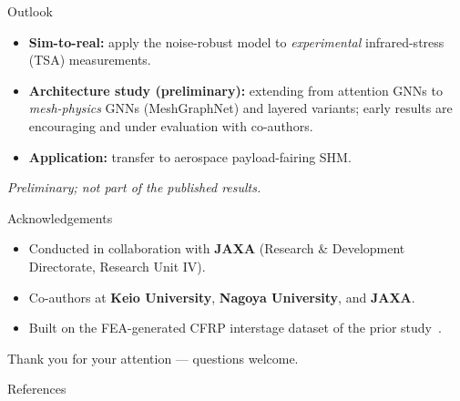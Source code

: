 \documentclass[aspectratio=169,11pt]{beamer}
\renewcommand*{\bibfont}{\scriptsize}
\begin{document}
\begin{frame}{Outlook }
\begin{itemize}
  \item \textbf{Sim-to-real:} apply the noise-robust model to \emph{experimental}
        infrared-stress (TSA) measurements.
  \item \textbf{Architecture study (preliminary):} extending from attention
        GNNs to \emph{mesh-physics} GNNs (MeshGraphNet) and layered variants;
        early results are encouraging and under evaluation with co-authors.
  \item \textbf{Application:} transfer to aerospace payload-fairing SHM.
\end{itemize}
\vspace{0.3em}
{\footnotesize\itshape Preliminary; not part of the published results.}
\end{frame}

\begin{frame}{Acknowledgements}
\begin{itemize}
  \item Conducted in collaboration with \textbf{JAXA} (Research \& Development Directorate, Research Unit IV).
  \item Co-authors at \textbf{Keio University}, \textbf{Nagoya University}, and \textbf{JAXA}.
  \item Built on the FEA-generated CFRP interstage dataset of the prior study~\cite{kojima}.
\end{itemize}
\vspace{0.8em}
\centering Thank you for your attention --- questions welcome.
\end{frame}

\begin{frame}[allowframebreaks]{References}
\renewcommand*{\bibfont}{\tiny}
\printbibliography[heading=none]
\end{frame}
\end{document}
